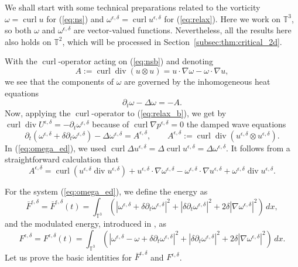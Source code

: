 \documentclass[reqno,10pt]{amsart}
\theoremstyle{definition}
\theoremstyle{remark}
\numberwithin{equation}{section}
\DeclareMathOperator{\dive}{div}
\DeclareMathOperator{\curl}{curl}
\begin{document}
We shall start with some technical preparations related to the vorticity $\omega = \curl u$ for (\ref{eq:ns}) and $\omega^{\epsilon,\delta} = \curl u^{\epsilon,\delta}$ for (\ref{eq:relax}). Here we work on $\mathbb T^3$, so both $\omega$ and $\omega^{\epsilon,\delta}$ are vector-valued functions. Nevertheless, all the results here also holds on $\mathbb T^2$, which will be processed in Section~\ref{subsec:thm:critical_2d}.

With the $\curl$-operator acting on (\ref{eq:nsb}) and denoting 
\begin{equation} \label{eq:A0_def}
    A:=\curl\dive(u\otimes u) = u\cdot \nabla \omega - \omega \cdot \nabla u,
\end{equation}
we see that the components of $\omega$ are governed by the inhomogeneous heat equations 
\begin{equation} \label{eq:omega_ns}
    \partial_t\omega - \Delta \omega = -A.
\end{equation}
Now, applying the $\curl$-operator to (\ref{eq:relax_b}), we get by $\curl \dive U^{\epsilon,\delta} = -\partial_t \omega^{\epsilon,\delta}$ because of $\curl\nabla p^{\epsilon,\delta}=0$ the damped wave equations 
\begin{equation} \label{eq:omega_ed}
    \partial_t \left( \omega^{\epsilon,\delta} + \delta\partial_t\omega^{\epsilon,\delta} \right) - \Delta \omega^{\epsilon,\delta} =  A^{\epsilon,\delta}, \qquad A^{\epsilon,\delta}:= \curl\dive(u^{\epsilon,\delta}\otimes u^{\epsilon,\delta}).
\end{equation}
In (\ref{eq:omega_ed}), we used $\curl\Delta u^{\epsilon,\delta}=\Delta\curl u^{\epsilon,\delta}=\Delta \omega^{\epsilon,\delta}$.  It follows from a straightforward calculation that
\begin{equation} \label{eq:A_def}
    A^{\epsilon,\delta} = \curl(u^{\epsilon,\delta}\dive u^{\epsilon,\delta}) + u^{\epsilon,\delta}\cdot \nabla \omega^{\epsilon,\delta} - \omega^{\epsilon,\delta}\cdot \nabla u^{\epsilon,\delta} + \omega^{\epsilon,\delta}\dive u^{\epsilon,\delta}.
\end{equation}

For the system (\ref{eq:omega_ed}), we define the energy as
\begin{equation} \label{eq:Fbar}
    \bar F^{\epsilon,\delta} = \bar F^{\epsilon,\delta}(t) = \int_{\mathbb T^3} \left( \left|\omega^{\epsilon,\delta} + \delta\partial_t \omega^{\epsilon,\delta}\right|^2 + \left|\delta\partial_t \omega^{\epsilon,\delta}\right|^2 + 2\delta \left|\nabla \omega^{\epsilon,\delta} \right|^2 \right)\, dx,
\end{equation}
and the modulated energy, introduced in \cite{Brenier2003}, as 
\begin{equation} \label{eq:modulated_energy}
    F^{\epsilon,\delta} =    F^{\epsilon,\delta}(t) = \int_{\mathbb T^3} \left( \left|\omega^{\epsilon,\delta}-\omega + \delta\partial_t\omega^{\epsilon,\delta} \right|^2 +\left|\delta\partial_t\omega^{\epsilon,\delta}\right|^2 + 2\delta \left| \nabla \omega^{\epsilon,\delta} \right|^2 \right) \,dx.
\end{equation}
Let us prove the basic identities for $\bar F^{\epsilon,\delta}$ and $F^{\epsilon,\delta}$.
\end{document}
